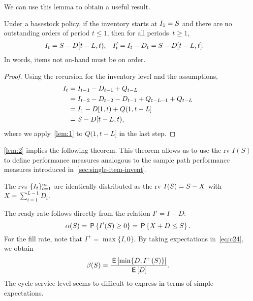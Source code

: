 \documentclass[stochastic-or.tex]{subfiles}
\begin{document}
We can use this lemma to obtain a useful result.
\begin{lemma}\label{lem:2}
Under a basestock policy, if the inventory starts at $I_{1} = S$ and there are no outstanding orders of period $t \leq 1$, then for all periods~$t\geq 1$,
  \begin{align*}
    I_t&= S - D[t-L, t), &  I_t'&= I_{t} - D_{t} = S - D[t-L, t].
  \end{align*}
In words, items not on-hand must be on order.
\end{lemma}
\begin{proof}
Using the recursion for the inventory level and the assumptions,
\begin{align*}
  I_{t}
&= I_{t-1} -D_{t-1}+ Q_{t-L} \\
&= I_{t-2}- D_{t-2}  - D_{t-1} +Q_{t-L-1} + Q_{t-L}\\
&= I_{1}- D[1, t) + Q(1, t-L] \\
&= S - D[t-L, t),
\end{align*}
where we apply~\cref{lem:1} to $Q(1, t-L]$ in the last step.
\end{proof}

\cref{lem:2} implies the following theorem.
This theorem allows us to use the rv $I(S)$ to define performance measures analogous to the sample path performance measures introduced in~\cref{sec:single-item-invent}.
\begin{theorem}
The rvs $\{I_{t}\}_{t=1}^{\infty}$ are identically distributed as the rv $I(S) = S - X$ with $X=\sum_{i=1}^{L-1} D_{i}$.
\end{theorem}

The ready rate follows directly from the relation $I' = I- D$:
\begin{equation}
\label{eq:5}
\alpha(S) =  \P{I'(S)\geq 0} = \P{X+D\leq S}.
\end{equation}
For the fill rate, note that $I^{+} = \max\{I, 0\}$. By taking expectations in~\cref{eq:c24},  we obtain
\begin{equation*}
\beta(S) = \frac{\,\mathsf{E}\left[\min\{D, I^{+}(S)\}\right]}{\,\mathsf{E}\left[D\right]}.
\end{equation*}
The cycle service level seems to difficult to express in terms of simple expectations.
\end{document}
